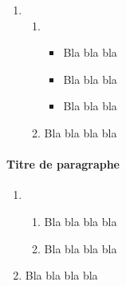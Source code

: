 \documentclass{article}
\newenvironment{questions}
      {\begin{enumerate}[label=\arabic*.]}
      {\end{enumerate}}
\newenvironment{sousquestions}
      {\begin{enumerate}[label=(\alph*)]}
      {\end{enumerate}}
\begin{document}
    \begin{questions}
        \item
        \begin{sousquestions}
            \item
            \begin{itemize}
               \item Bla bla bla
               \item Bla bla bla
               \item Bla bla bla
           \end{itemize}
           \item Bla bla bla bla
        \end{sousquestions}
    \end{questions}

    \paragraph{Titre de paragraphe}%

    \begin{questions}
        \item
        \begin{sousquestions}
               \item Bla bla bla bla
               \item Bla bla bla bla
        \end{sousquestions}
        \item Bla bla bla bla
    \end{questions}

    
\end{document}
